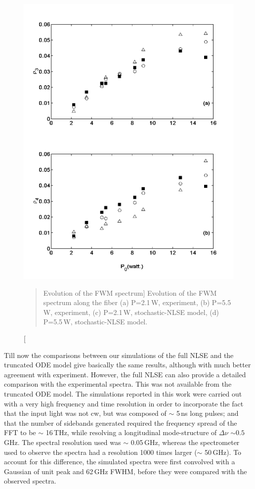 \begin{figure}
\begin{center}
\includegraphics[width=5in]{nlsefinal.pdf}
\end{center}
\renewcommand{\baselinestretch}{1}
\small\normalsize
\begin{quote}
\caption
[Evolution of the FWM spectrum]
{Evolution of the FWM spectrum along the fiber (a) P=2.1\,W, experiment, (b) P=5.5\,W, experiment, (c) P=2.1\,W, stochastic-NLSE model, (d) P=5.5\,W, stochastic-NLSE model.}
\label{figA.9}
\end{quote}
\end{figure}
\renewcommand{\baselinestretch}{2}
\small\normalsize

Till now the comparisons between our simulations of the full NLSE and the
truncated ODE model give basically the same results, although with much better
agreement with experiment. However, the full NLSE can also provide a detailed
comparison with the experimental spectra. This was not available from the
truncated ODE model. The simulations reported in this work were carried out
with a very high frequency and time resolution in order to incorporate the
fact that the input light was not cw, but was composed of $\sim$ 5\,ns long
pulses; and that the number of sidebands generated required the frequency
spread of the FFT to be $\sim$ 16\,THz, while resolving a longitudinal
mode-structure of $\Delta\nu$ $\sim 0.5$\,GHz. The spectral resolution used was
$\sim$ 0.05\,GHz, whereas the spectrometer used to observe the spectra had a
resolution 1000 times larger ($\sim$ 50\,GHz). To account for this difference,
the simulated spectra were first convolved with a Gaussian of unit peak and
62\,GHz FWHM, before they were compared with the observed spectra.

